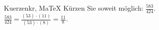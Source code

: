 \begin{MAufgabe}{Kuerzen}{kr, MaTeX}
K\"urzen Sie soweit m\"oglich: $\frac{583}{424}$.\\ 
\ifLsg\MLoesung
\quad $\frac{583}{424}=\frac{(53)\cdot(11)}{(53)\cdot(8)}=\frac{11}{8}$.\else\relax\fi
 \end{MAufgabe}